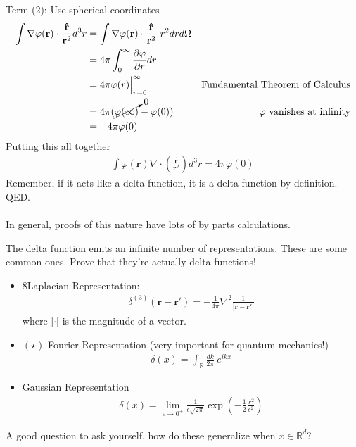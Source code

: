 \documentclass[12pt,fleqn]{article}
\numberwithin{equation}{section} %
\newcounter{problem}
\begin{document}
Term (2): Use spherical coordinates
\begin{align}
	\int \nabla\varphi(\mathbf r) \cdot \frac{\mathbf{\hat{r}}}{\mathbf r^2} d^3r & = \int \nabla \varphi(\mathbf r) \cdot \frac{\mathbf{\hat{r}}}{\mathbf r^2} ~r^2 dr   d \Omega \\
	&= 4\pi   \int_0^\infty \frac{\partial \varphi}{\partial r}  dr \\
	& = 4\pi \varphi(r) \Big|_{r=0}^\infty & \text{Fundamental Theorem of Calculus}\\
	&  = 4\pi ( \cancelto{0}{\varphi(\infty)} - \varphi(0)) & \varphi \text{ vanishes at infinity}\\
	& = -4\pi \varphi(0)
\end{align}
Putting this all together
\begin{align}
	\int \varphi(\mathbf r) \nabla \cdot \left( \frac{\mathbf{\hat{r}}}{\mathbf r^2} \right) d^3 r = 4\pi \varphi(0)
\end{align}
Remember, if it acts like a delta function, it is a delta function by definition. QED.\\
\\
In general, proofs of this nature have lots of by parts calculations.
\begin{problem} The delta function emits an infinite number of representations. These are some common ones. Prove that they're actually delta functions!
	\begin{itemize}
		\item 8Laplacian Representation:
		\begin{align}
			\delta^{(3)} (\mathbf r - \mathbf r') = - \frac{1}{4\pi} \nabla^2 \frac{1}{|\mathbf r - \mathbf r'|}
		\end{align}
		where $|\cdot |$ is the magnitude of a vector.
		\item $(\star)$ Fourier Representation (very important for quantum mechanics!)
		\begin{align}
			\delta(x) = \int_{\mathbb R} \frac{d k}{2\pi} ~ e^{i k x}
		\end{align}
		
		\item Gaussian Representation
		\begin{align}
			\delta(x) = \lim_{\epsilon \to 0^+}  \frac{1}{\epsilon \sqrt{2\pi}} \exp \left(-\frac{1}{2} \frac{x^2}{\epsilon^2} \right)
		\end{align}
	\end{itemize}
	A good question to ask yourself, how do these generalize when $x \in \mathbb R^d$?
\end{problem}
\end{document}
